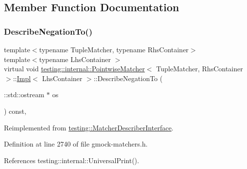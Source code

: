 \subsection{Member Function Documentation}
\mbox{\label{classtesting_1_1internal_1_1PointwiseMatcher_1_1Impl_a26d3a829149e4c497aaced42aad7b247}} 
\subsubsection{\texorpdfstring{Describe\+Negation\+To()}{DescribeNegationTo()}}
{\footnotesize\ttfamily template$<$typename Tuple\+Matcher, typename Rhs\+Container$>$ \\
template$<$typename Lhs\+Container $>$ \\
virtual void \hyperlink{classtesting_1_1internal_1_1PointwiseMatcher}{testing\+::internal\+::\+Pointwise\+Matcher}$<$ Tuple\+Matcher, Rhs\+Container $>$\+::\hyperlink{classtesting_1_1internal_1_1PointwiseMatcher_1_1Impl}{Impl}$<$ Lhs\+Container $>$\+::Describe\+Negation\+To (\begin{DoxyParamCaption}\item[{\+::std\+::ostream $\ast$}]{os }\end{DoxyParamCaption}) const\hspace{0.3cm}{\ttfamily [inline]}, {\ttfamily [virtual]}}



Reimplemented from \hyperlink{classtesting_1_1MatcherDescriberInterface_a2071afbc47097c4d1c0064275af34db0}{testing\+::\+Matcher\+Describer\+Interface}.



Definition at line 2740 of file gmock-\/matchers.\+h.



References testing\+::internal\+::\+Universal\+Print().


